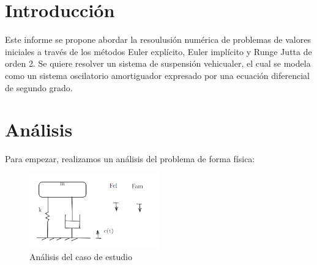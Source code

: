 \section{Introducción}
Este informe se propone abordar la resoulusión numérica de problemas de valores iniciales a través de los métodos Euler explícito, Euler implícito y Runge Jutta de orden 2. Se quiere resolver un sistema de suspensión vehicualer, el cual se modela como un sistema oscilatorio amortiguador expresado por una ecuación diferencial de segundo grado.
\section{Análisis}
Para empezar, realizamos un análisis del problema de forma física:
\begin{figure}[h] 
    \centering
    \includegraphics[width=0.5\textwidth]{imagenes/analisis.png}
    \caption{Análisis del caso de estudio}
    \label{fig:mi_figura}
\end{figure}

